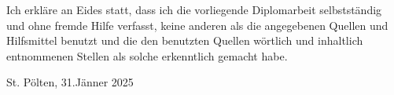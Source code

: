 \begin{eides}
Ich erkläre an Eides statt, dass ich die vorliegende Diplomarbeit selbstständig und ohne fremde Hilfe verfasst, keine anderen als die angegebenen
Quellen und Hilfsmittel benutzt und die den benutzten Quellen wörtlich und inhaltlich entnommenen Stellen als solche erkenntlich gemacht habe.
	
\vspace{20pt}	
\begin{flushright}
		St. Pölten, 31.Jänner 2025
\end{flushright}
	
\end{eides}